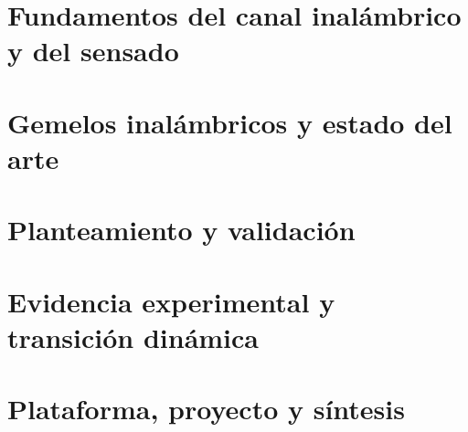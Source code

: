 \documentclass[12pt,oneside]{report}
\begin{document}

\hypersetup{pageanchor=true}


\clearpage
\tableofcontents
\clearpage
\glsaddall[types=\acronymtype]
\printglossary[type=\acronymtype,title=Acrónimos]
\clearpage

\part{Fundamentos del canal inalámbrico y del sensado}




\part{Gemelos inalámbricos y estado del arte}




\part{Planteamiento y validación}


\part{Evidencia experimental y transición dinámica}


\part{Plataforma, proyecto y síntesis}



\clearpage


\end{document}
